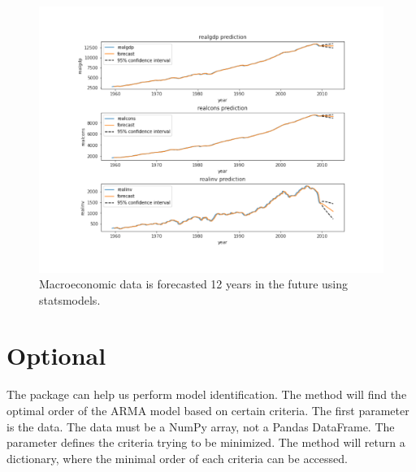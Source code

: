 \begin{figure}[H]
\centering
\includegraphics[width=\textwidth]{figures/econ2.pdf}
\caption{Macroeconomic data is forecasted 12 years in the future using statsmodels.}
\label{fig:econ}
\end{figure}

\section*{Optional}
The  package can help us perform model identification.
The method  will find the optimal order of the ARMA model based on certain criteria.
The first parameter  is the data.
The data must be a NumPy array, not a Pandas DataFrame.
The parameter  defines the criteria trying to be minimized.
The method will return a dictionary, where the minimal order of each criteria can be accessed.

